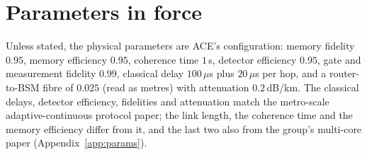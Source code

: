 \section{Parameters in force}
Unless stated, the physical parameters are ACE's configuration: memory fidelity $0.95$, memory efficiency $0.95$, coherence
time $1$\,s, detector efficiency $0.95$, gate and measurement fidelity $0.99$, classical delay $100\,\mu$s plus $20\,\mu$s
per hop, and a router-to-BSM fibre of $0.025$ (read as metres) with attenuation $0.2$\,dB/km. The classical delays, detector efficiency, fidelities and attenuation match the metro-scale adaptive-continuous protocol paper; the link length, the coherence time and the memory efficiency differ from it, and the last two also from the group's multi-core paper (Appendix~\ref{app:params}).
